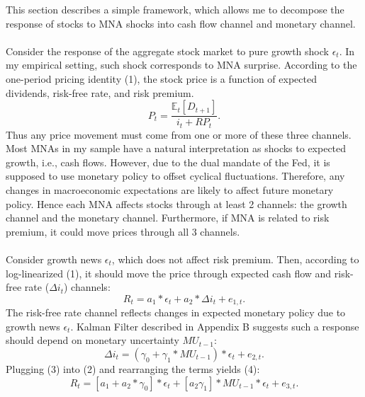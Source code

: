 \documentclass[12pt]{article}
\begin{document}
This section describes a simple framework, which allows me to decompose the response of stocks to MNA shocks into cash flow channel and monetary channel.
\paragraph{}
Consider the response of the aggregate stock market to pure growth shock $\epsilon_t$. In my empirical setting, such shock corresponds to MNA surprise. According to the one-period pricing identity (1), the stock price is a function of expected dividends, risk-free rate, and risk premium.
\begin{equation}
    P_t = \frac{\mathbb{E}_t[D_{t+1}]}{i_t + RP_t}.
\end{equation}
Thus any price movement must come from one or more of these three channels. Most MNAs in my sample have a natural interpretation as shocks to expected growth, i.e., cash flows. However, due to the dual mandate of the Fed, it is supposed to use monetary policy to offset cyclical fluctuations. Therefore, any changes in macroeconomic expectations are likely to affect future monetary policy. Hence each MNA affects stocks through at least 2 channels: the growth channel and the monetary channel. Furthermore, if MNA is related to risk premium, it could move prices through all 3 channels. 
\paragraph{}
Consider growth news $\epsilon_t$, which does not affect risk premium. Then, according to log-linearized (1), it should move the price through expected cash flow and risk-free rate ($\Delta i_t$) channels:
\begin{equation}
    R_t = a_1*\epsilon_t + a_2*\Delta i_t + e_{1,t}.
\end{equation}
The risk-free rate channel reflects changes in expected monetary policy due to growth news $\epsilon_t$. Kalman Filter described in Appendix B suggests such a response should depend on monetary uncertainty $MU_{t-1}$:
\begin{equation}
    \Delta i_t = (\gamma_0 + \gamma_1*MU_{t-1})*\epsilon_t + e_{2,t}.
\end{equation}
Plugging (3) into (2) and rearranging the terms yields (4):
\begin{equation}
    R_t = [a_1+a_2*\gamma_0]*\epsilon_t + [a_2\gamma_1]*MU_{t-1}*\epsilon_t + e_{3,t}.
\end{equation}
\end{document}
